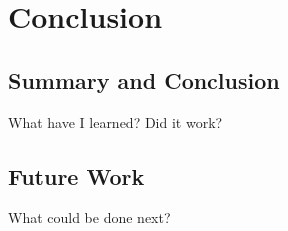 \chapter{Conclusion}

\section{Summary and Conclusion}

What have I learned? Did it work?

\section{Future Work}

What could be done next?